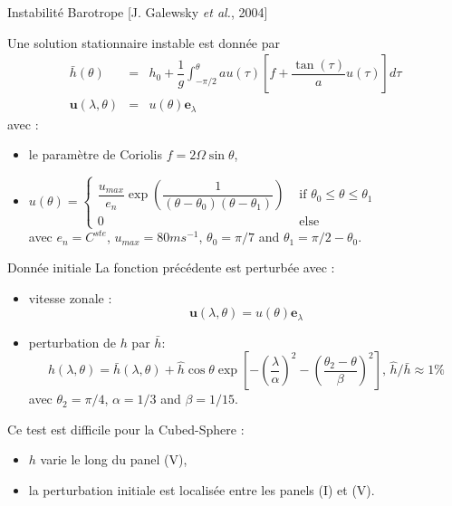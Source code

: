 \documentclass[11pt]{beamer}
\def\gint{\displaystyle\int}
\begin{document}

\begin{frame}{Instabilité Barotrope [J. Galewsky \textit{et al.}, 2004]}
\begin{exampleblock}{}
Une solution stationnaire instable est donnée par
\begin{equation}
\begin{array}{rcl}
\bar{h}(\theta) & = & h_0 + \dfrac{1}{g}\gint^{\theta}_{-\pi/2} a u(\tau) \left[ f + \dfrac{\tan(\tau)}{a} u(\tau) \right] d \tau \\
\mathbf{u}(\lambda,\theta) & = & u(\theta) \mathbf{e}_{\lambda}
\end{array}
\end{equation}
avec :
\begin{itemize}
\item le paramètre de Coriolis $f = 2 \Omega \sin \theta$,
\item $u(\theta)=\left\lbrace
\begin{array}{ll}
\dfrac{u_{max}}{e_n} \exp\left( \dfrac{1}{(\theta-\theta_0)(\theta-\theta_1)} \right) & \text{ if } \theta_0 \leq \theta \leq \theta_1 \\
0 & \text{ else}
\end{array}\right.$\\
 avec $e_n=C^{ste}$, $u_{max} = 80 ms^{-1}$, $\theta_0 = \pi/7$ and $\theta_1 = \pi/2 - \theta_0$.
\end{itemize}
\end{exampleblock}
\end{frame}



\begin{frame}{}
\begin{exampleblock}{Donnée initiale}
La fonction précédente est perturbée avec :
\begin{itemize}
\item vitesse zonale :
$$\mathbf{u}(\lambda,\theta) = u(\theta) \mathbf{e}_{\lambda}$$
\item perturbation de $h$ par $\bar{h}$:
$$h(\lambda,\theta) = \bar{h}(\lambda,\theta) + \hat{h} \cos \theta \exp \left[ - \left( \dfrac{\lambda}{\alpha} \right)^2 - \left( \dfrac{\theta_2 - \theta}{\beta} \right)^2 \right] \text{, } \hat{h}/\bar{h} \approx 1 \%$$
avec $\theta_2 = \pi/4$, $\alpha = 1/3$ and $\beta = 1/15$.
\end{itemize}
\end{exampleblock}
\begin{block}{}
Ce test est difficile pour la Cubed-Sphere :
\begin{itemize}
\item $h$ varie le long du panel (V),
\item la perturbation initiale est localisée entre les panels (I) et (V).
\end{itemize}
\end{block}
\end{frame}
\end{document}

